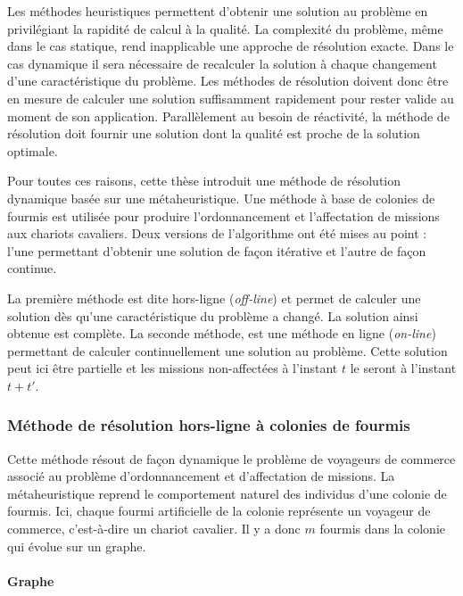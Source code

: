 Les méthodes heuristiques permettent d'obtenir une solution au problème en privilégiant la rapidité de calcul à la qualité. La complexité du problème, même dans le cas statique, rend inapplicable une approche de résolution exacte. Dans le cas dynamique il sera nécessaire de recalculer la solution à chaque changement d'une caractéristique du problème. Les méthodes de résolution doivent donc être en mesure de calculer une solution suffisamment rapidement pour rester valide au moment de son application. Parallèlement au besoin de réactivité, la méthode de résolution doit fournir une solution dont la qualité est proche de la solution optimale.

Pour toutes ces raisons, cette thèse introduit une méthode de résolution dynamique basée sur une métaheuristique. Une méthode à base de colonies de fourmis est utilisée pour produire l'ordonnancement et l'affectation de missions aux chariots cavaliers. Deux versions de l'algorithme ont été mises au point : l'une permettant d'obtenir une solution de façon itérative et l'autre de façon continue.

La première méthode est dite hors-ligne (\textit{off-line}) et permet de calculer une solution dès qu'une caractéristique du problème a changé. La solution ainsi obtenue est complète. La seconde méthode, est une méthode en ligne (\textit{on-line}) permettant de calculer continuellement une solution au problème. Cette solution peut ici être partielle et les missions non-affectées à l'instant $t$ le seront à l'instant $t+t'$.

\subsubsection{Méthode de résolution hors-ligne à colonies de fourmis}\label{chap:ordo:reso:offlineACO}

Cette méthode résout de façon dynamique le problème de voyageurs de commerce associé au problème d'ordonnancement et d'affectation de missions. La métaheuristique reprend le comportement naturel des individus d'une colonie de fourmis. Ici, chaque fourmi artificielle de la colonie représente un voyageur de commerce, c'est-à-dire un chariot cavalier. Il y a donc $m$ fourmis dans la colonie qui évolue sur un graphe.

\paragraph{Graphe}


